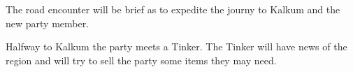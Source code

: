 The road encounter will be brief as to expedite the journy to Kalkum and the new party member.

Halfway to Kalkum the party meets a Tinker.
The Tinker will have news of the region and will try to sell the party some items they may need.
